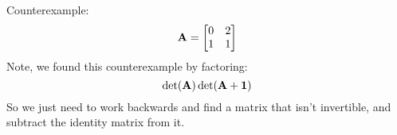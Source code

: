 \begin{sol}
    Counterexample:
    \begin{equation}
        \mathbf{A} = \begin{bmatrix}
            0 & 2 \\ 
            1 & 1
        \end{bmatrix}
    \end{equation}
    Note, we found this counterexample by factoring:
    \begin{equation}
        \det(\mathbf{A})\det(\mathbf{A}+\mathbf{1})
    \end{equation}
    So we just need to work backwards and find a matrix that isn't invertible, and subtract the identity matrix from it.
\end{sol}
